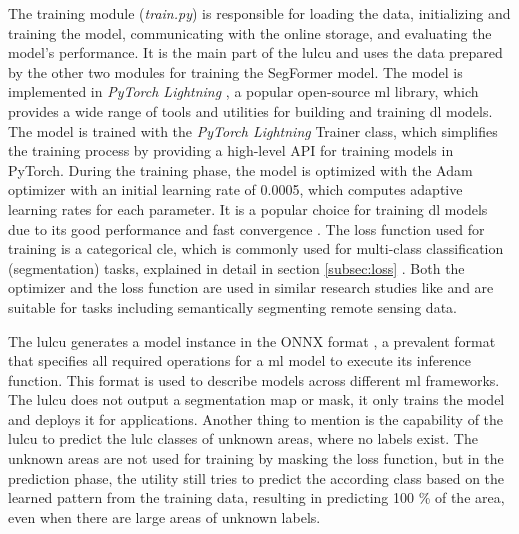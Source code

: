 The training module (\emph{train.py}) is responsible for loading the data, initializing and training the model, communicating with the online storage, and evaluating the model's performance. It is the main part of the \gls{lulcu} and uses the data prepared by the other two modules for training the SegFormer model. The model is implemented in \emph{PyTorch Lightning} \autocite{LightningAI2024}, a popular open-source \gls{ml} library, which provides a wide range of tools and utilities for building and training \gls{dl} models. The model is trained with the \emph{PyTorch Lightning} Trainer class, which simplifies the training process by providing a high-level API for training models in PyTorch. During the training phase, the model is optimized with the Adam optimizer with an initial learning rate of 0.0005, which computes adaptive learning rates for each parameter. It is a popular choice for training \gls{dl} models due to its good performance and fast convergence \autocite{Kingma.Ba2015}. The loss function used for training is a categorical \gls{cle}, which is commonly used for multi-class classification (segmentation) tasks, explained in detail in section \ref{subsec:loss} \autocite{Diakogiannis.Waldner.ea2020}. Both the optimizer and the loss function are used in similar research studies like \textcite{Diakogiannis.Waldner.ea2020,Tzepkenlis.Marthoglou.ea2023} and are suitable for tasks including semantically segmenting remote sensing data.

The \gls{lulcu} generates a model instance in the ONNX format \autocite{ONNX.ai2024}, a prevalent format that specifies all required operations for a \gls{ml} model to execute its inference function. This format is used to describe models across different \gls{ml} frameworks. The \gls{lulcu} does not output a segmentation map or mask, it only trains the model and deploys it for applications. Another thing to mention is the capability of the \gls{lulcu} to predict the \gls{lulc} classes of unknown areas, where no labels exist. The unknown areas are not used for training by masking the loss function, but in the prediction phase, the utility still tries to predict the according class based on the learned pattern from the training data, resulting in predicting 100 \% of the area, even when there are large areas of unknown labels.

